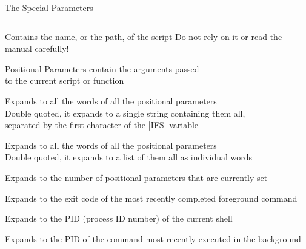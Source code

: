 
\begin{frame}{The Special Parameters}{}
    \vspace{-8mm}
    \begin{columns}
        \begin{column}{\dimexpr\paperwidth-10mm}
            \begin{description}
                \setlength{\itemsep}{1mm}
                \item[\texttt{0}]
                    Contains the name, or the path, of the script
                    Do not rely on it or read the manual carefully!
                \item[\texttt{1 2 \ldots}]
                    \alert{Positional Parameters} contain the arguments passed\\
                    to the current script or function
                \item[\texttt{*}]
                    Expands to all the words of all the positional parameters\\
                    Double quoted, it expands to a single string containing them all,\\ separated by the first character of the \bash|IFS| variable
                \item[\texttt{@}]
                    Expands to all the words of all the positional parameters\\
                    Double quoted, it expands to a list of them all as individual words
                \item[\texttt{\#}]
                    Expands to the number of positional parameters that are currently set
                \item[\texttt{?}]
                    Expands to the exit code of the most recently completed foreground command
                \item[\texttt{\$}]
                    Expands to the PID (process ID number) of the current shell
                \item[\texttt{!}]
                    Expands to the PID of the command most recently executed in the background
                \item[\texttt{\_}]

\end{description}
\end{column}
\end{columns}
\end{frame}
